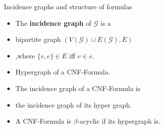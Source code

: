 \begin{frame}[t]{Incidence graphs and structure of formulas}
	\begin{itemize}
		\item The \textbf{incidence graph} of $\mathcal{G}$ is a 
		\item[] \hspace{1cm}bipartite graph $(V(\mathcal{G}) \cup E(\mathcal{G}), E)$
		\item[] \hspace{1cm},where $\{v, e\} \in E$ iff $v \in e$.
			\vspace{.5cm}
		\item Hypergraph of a CNF-Formula.
		\item The incidence graph of a CNF-Formula is 
		\item[] \hspace {1cm} the incidence graph of its hyper graph.
		\item A CNF-Formula is $\beta$-acyclic if its hypergraph is.
	\end{itemize}

\end{frame}
	

